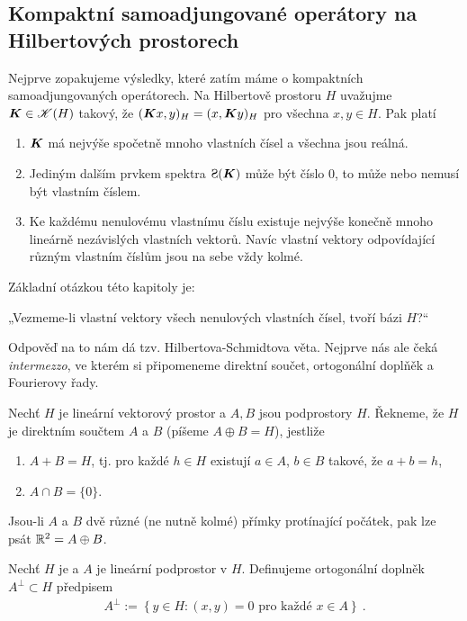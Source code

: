 \subsection{Kompaktní samoadjungované operátory na Hilbertových prostorech}

Nejprve zopakujeme výsledky, které zatím máme o kompaktních samoadjungovaných operátorech. Na Hilbertově prostoru $H$ uvažujme $\boldsymbol{K} \in \mathscr{K} (H)$ takový, že $(\boldsymbol{K} x,y)_H = (x, \boldsymbol{K} y)_H$ pro všechna $x,y \in H$. Pak platí \begin{enumerate}
    \item $\boldsymbol{K}$ má nejvýše spočetně mnoho vlastních čísel a všechna jsou reálná.
    \item Jediným dalším prvkem spektra $\Sp(\map K)$ může být číslo $0$, to může nebo nemusí být vlastním číslem.
    \item Ke každému nenulovému vlastnímu číslu existuje nejvýše konečně mnoho lineárně nezávislých vlastních vektorů. Navíc vlastní vektory odpovídající různým vlastním číslům jsou na sebe vždy kolmé.
\end{enumerate}
Základní otázkou této kapitoly je:
\begin{center}
    „Vezmeme-li vlastní vektory všech nenulových vlastních čísel, tvoří bázi $H$?“
\end{center}
Odpověď na to nám dá tzv. Hilbertova-Schmidtova věta. Nejprve nás ale čeká \textit{intermezzo}, ve kterém si připomeneme direktní součet, ortogonální doplňěk a Fourierovy řady.

\begin{definition}
Nechť $H$ je lineární vektorový prostor a $A,B$ jsou podprostory $H$. Řekneme, že $H$ je direktním součtem $A$ a $B$ (píšeme $A \oplus B = H$), jestliže \begin{enumerate}
    \item $A+B=H$, tj. pro každé $h \in H$ existují $a \in A$, $b \in B$ takové, že $a+b=h$,
    \item $A \cap B = \{0 \}$.
\end{enumerate}
\end{definition}

\begin{example}
Jsou-li $A$ a $B$ dvě různé (ne nutně kolmé) přímky protínající počátek, pak lze psát $\mathbb{R}^2 = A \oplus B$.
\end{example}

\begin{definition}
Nechť $H$ je  a $A$ je  lineární podprostor v $H$. Definujeme ortogonální doplněk $A^\bot \subset H$ předpisem \begin{align*}
    A^\bot := \left \lbrace y \in H: (x,y)=0 \text{ pro každé } x \in A  \right \rbrace \:.
\end{align*}
\end{definition}

